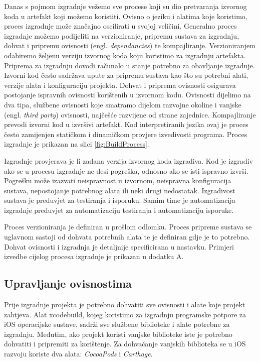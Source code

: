 \documentclass[times, utf8, diplomski, numeric]{fer}
\newcommand{\eng}[1]{(engl. \textit{#1})}
\begin{document}
Danas s pojmom izgradnje vežemo sve procese koji su dio pretvaranja izvornog koda u artefakt koji možemo koristiti. Ovisno o jeziku i alatima koje koristimo, proces izgradnje može značajno oscilirati u svojoj veličini. Generalno proces izgradnje možemo podijeliti na verzioniranje, pripremu sustava za izgradnju, dohvat i pripremu ovisnosti \eng{dependancies} te kompajliranje. Verzioniranjem odabiremo željenu verziju izvornog koda koju koristimo za izgradnju artefakta. Priprema za izgradnju dovodi računalo u stanje potrebno za obavljanje izgradnje. Izvorni kod često sadržava upute za pripremu sustava kao što su potrebni alati, verzije alata i konfiguraciju projekta. Dohvat i priprema ovisnosti osigurava postojanje ispravnih ovisnosti korištenih u izvornom kodu. Ovisnosti dijelimo na dva tipa, službene ovisnosti koje smatramo dijelom razvojne okoline i vanjske \eng{third party} ovisnosti, najčešće razvijene od strane zajednice. Kompajliranje prevodi izvorni kod u izvršivi artefakt. Kod interpretiranih jezika ovaj je proces često zamijenjen statičkom i dinamičkom provjere izvedivosti programa. Proces izgradnje je prikazan na slici \ref{fig:BuildProcess}.

Izgradnje provjerava je li zadana verzija izvornog koda izgradiva. Kod je izgradiv ako se u procesu izgradnje ne desi pogreška, odnosno ako se isti ispravno izvrši. Pogrešku može izazvati neispravnost u izvornom, neispravna konfiguracija sustava, nepostojanje potrebnog alata ili neki drugi nedostatak. Izgradivost sustava je preduvjet za  testiranja i isporuku. Samim time je automatizacija izgradnje preduvjet za automatizaciju testiranja i automatizaciju isporuke.

Proces verzioniranja je definiran u prošlom odlomku. Proces pripreme sustava se uglavnom sastoji od dohvata potrebnih alata te je definiran gdje je to potrebno. Dohvat ovisnosti i izgradnja je detaljnije specificirana u nastavku. Primjeri izvedbe cijelog procesa izgradnje je prikazan u dodatku A.

\subsection{Upravljanje ovisnostima}

Prije izgradnje projekta je potrebno dohvatiti sve ovisnosti i alate koje projekt zahtjeva. Alat xcodebuild, kojeg koristimo za izgradnju programske potpore za iOS operacijske sustave, sadrži sve službene biblioteke i alate potrebne za izgradnju. Međutim, ako projekt koristi vanjske biblioteke iste je potrebno dohvatiti i pripremiti za korištenje. Za dohvaćanje vanjskih biblioteka se u iOS razvoju koriste dva alata: \textit{CocoaPods} i \textit{Carthage}.
\end{document}
